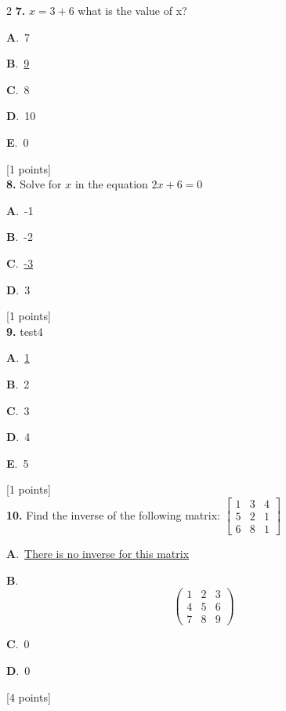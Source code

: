 \documentclass[12pt]{article}
\newcommand{\choice}[3]{%
  \noindent\textbf{#1}.~#2\hfill#3\par\vspace{0.25em}
}
\begin{document}
\begin{multicols}{2}
\noindent \textbf{\textenglish{7.}} \(x=3+6 \){\textenglish{ what is the value of x?}}

\noindent\choice{A}{{\textenglish{7}}}{}
\noindent\choice{B}{\underline{{\textenglish{9}}}}{}
\noindent\choice{C}{{\textenglish{8}}}{}
\noindent\choice{D}{{\textenglish{10}}}{}
\noindent\choice{E}{{\textenglish{0}}}{}
\hfill {\textenglish{[1 points]}}\\[0.5em]

\noindent \textbf{\textenglish{8.}} {\textenglish{Solve for }}\(x \){\textenglish{ in the equation }}\(2x+6 = 0 \)

\noindent\choice{A}{{\textenglish{-1}}}{}
\noindent\choice{B}{{\textenglish{-2}}}{}
\noindent\choice{C}{\underline{{\textenglish{-3}}}}{}
\noindent\choice{D}{{\textenglish{3}}}{}
\hfill {\textenglish{[1 points]}}\\[0.5em]

\noindent \textbf{\textenglish{9.}} {\textenglish{test4}}

\noindent\choice{A}{\underline{{\textenglish{1}}}}{}
\noindent\choice{B}{{\textenglish{2}}}{}
\noindent\choice{C}{{\textenglish{3}}}{}
\noindent\choice{D}{{\textenglish{4}}}{}
\noindent\choice{E}{{\textenglish{5}}}{}
\hfill {\textenglish{[1 points]}}\\[0.5em]

\noindent \textbf{\textenglish{10.}} {\textenglish{Find the inverse of the following matrix: }}\(\begin{bmatrix} 1 & 3 & 4 \\ 5 & 2 & 1 \\ 6 & 8 & 1 \end{bmatrix}\)

\noindent\choice{A}{\underline{{\textenglish{There is no inverse for this matrix}}}}{}
\noindent\choice{B}{\[\begin{pmatrix} 1 & 2 & 3 \\ 4 & 5 & 6 \\ 7 & 8 & 9  \end{pmatrix}\]}{}
\noindent\choice{C}{{\textenglish{0}}}{}
\noindent\choice{D}{{\textenglish{0}}}{}
\hfill {\textenglish{[4 points]}}\\[0.5em]


\end{multicols}
\end{document}
